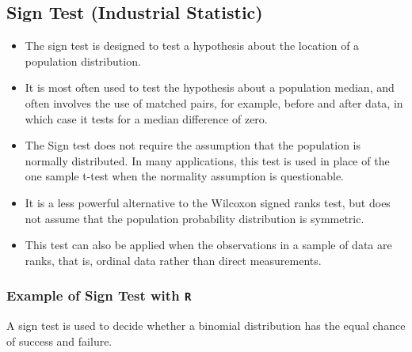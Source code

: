 \documentclass[12pt, a4paper]{report}
\theoremstyle{plain}
\theoremstyle{definition}
\theoremstyle{remark}
\begin{document}
\subsection*{Sign Test (Industrial Statistic)}
\begin{itemize}
\item The sign test is designed to test a hypothesis about the location of a population distribution. \item It is
most often used to test the hypothesis about a population median, and often involves the use of
matched pairs, for example, before and after data, in which case it tests for a median difference of
zero.
\item The Sign test does not require the assumption that the population is normally distributed.
In many applications, this test is used in place of the one sample t-test when the normality
assumption is questionable.
\item It is a less powerful alternative to the Wilcoxon signed ranks test, but
does not assume that the population probability distribution is symmetric.
\item This test can also be applied when the observations in a sample of data are ranks, that is, ordinal
data rather than direct measurements.
\end{itemize}

\subsubsection{Example of Sign Test with \texttt{R}}

A sign test is used to decide whether a binomial distribution has the equal chance of success and failure.
\end{document}
